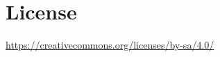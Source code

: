 \documentclass{article}
\newtheorem*{theorem A}{Theorem A}
\newtheorem*{theorem B}{N\"olker's Theorem}
\theoremstyle{remark}
\theoremstyle{remark}
\begin{document}
\section*{License}
\label{s:license}
\begin{center}
	\url{https://creativecommons.org/licenses/by-sa/4.0/}
\end{center}
%
%
%

%
%
\end{document}
